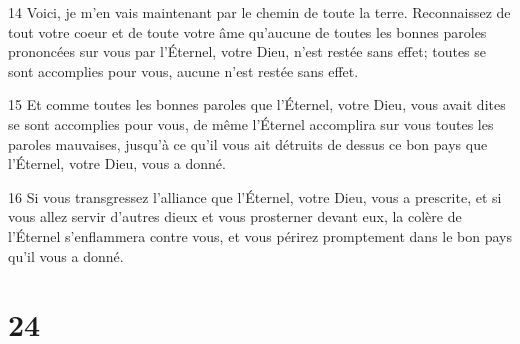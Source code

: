 \par 14 Voici, je m'en vais maintenant par le chemin de toute la terre. Reconnaissez de tout votre coeur et de toute votre âme qu'aucune de toutes les bonnes paroles prononcées sur vous par l'Éternel, votre Dieu, n'est restée sans effet; toutes se sont accomplies pour vous, aucune n'est restée sans effet.
\par 15 Et comme toutes les bonnes paroles que l'Éternel, votre Dieu, vous avait dites se sont accomplies pour vous, de même l'Éternel accomplira sur vous toutes les paroles mauvaises, jusqu'à ce qu'il vous ait détruits de dessus ce bon pays que l'Éternel, votre Dieu, vous a donné.
\par 16 Si vous transgressez l'alliance que l'Éternel, votre Dieu, vous a prescrite, et si vous allez servir d'autres dieux et vous prosterner devant eux, la colère de l'Éternel s'enflammera contre vous, et vous périrez promptement dans le bon pays qu'il vous a donné.

\chapter{24}

